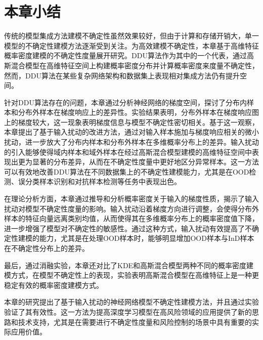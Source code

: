 \section{本章小结}




传统的模型集成方法建模不确定性虽然效果较好，但由于计算和存储开销大，单一模型的不确定性建模方法逐渐受到关注。为高效建模不确定性，本章基于高维特征概率密度建模的不确定性度量展开研究。DDU算法作为其中的一个代表，通过高斯混合模型在高维特征空间上构建概率密度分布并计算概率密度来度量不确定性，然而，DDU算法在某些复杂网络架构和数据集上表现相对集成方法仍有提升空间。

针对DDU算法存在的问题，本章通过分析神经网络的梯度空间，探讨了分布内样本和分布外样本在梯度响应上的差异性。实验结果表明，分布外样本在梯度响应图上的梯度较大，这一现象表明梯度信息与模型不确定性密切相关。基于这一观察，本章提出了基于输入扰动的改进方法，通过对输入样本施加与梯度响应相关的微小扰动，进一步放大了分布内样本和分布外样本在多维概率分布上的差异。输入扰动的引入能够使得域内样本和域外样本在经过高斯混合模型建模的高维特征空间中表现出更为显著的分布差异，从而在不确定性度量中更好地区分异常样本。这一方法可以有效地改善DDU算法在不同数据集上的不确定性建模能力，尤其是在OOD检测、误分类样本识别和对抗样本检测等任务中表现出色。



在理论分析方面，本章通过推导和分析概率密度关于输入的梯度性质，揭示了输入扰动对模型不确定性度量的影响。输入扰动沿着梯度方向进行调整，会使得分布外样本的特征向量远离类别均值，从而使得其在多维概率分布上的概率密度值下降，进一步增强了模型对不确定性的敏感性。通过这种方式，输入扰动有效提高了不确定性建模的能力，尤其是在处理OOD样本时，能够明显增加OOD样本与InD样本在不确定性分布上的差异。

最后，通过消融实验，本章还对比了KDE和高斯混合模型两种不同的概率密度建模方式，在模型不确定性上的表现，实验表明高斯混合模型在高维特征上是一种更稳定有效的概率密度建模方式。

本章的研究提出了基于输入扰动的神经网络模型不确定性建模方法，并且通过实验验证了其有效性。这一方法为提高深度学习模型在高风险领域的应用提供了新的思路和技术支持，尤其是在需要进行不确定性度量和风险控制的场景中具有重要的实际应用价值。

